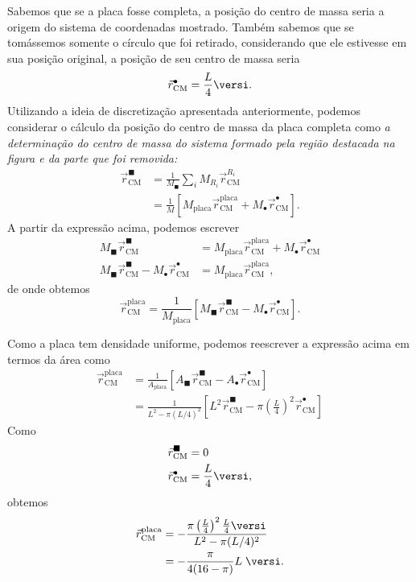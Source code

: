 Sabemos que se a placa fosse completa, a posição do centro de massa seria a origem do sistema de coordenadas mostrado. Também sabemos que se tomássemos somente o círculo que foi retirado, considerando que ele estivesse em sua posição original, a posição de seu centro de massa seria
\begin{equation}
    \vec{r}_{\text{CM}}^{\bullet} = \frac{L}{4} \versi.
\end{equation}
%
Utilizando a ideia de discretização apresentada anteriormente, podemos considerar o cálculo da posição do centro de massa da placa completa como \emph{a determinação do centro de massa do sistema formado pela região destacada na figura e da parte que foi removida:}
\begin{align}
    \vec{r}_{\text{CM}}^{\blacksquare} &= \frac{1}{M_{\blacksquare}} \sum_i M_{R_i} \vec{r}_{\text{CM}}^{R_i} \\
    &= \frac{1}{M} [M_{\text{placa}} \vec{r}_{\text{CM}}^{\text{placa}} + M_{\bullet} \vec{r}_{\text{CM}}^{\bullet}].
\end{align}
%
A partir da expressão acima, podemos escrever
\begin{align}
    M_{\blacksquare} \vec{r}_{\text{CM}}^{\blacksquare} &= M_{\text{placa}} \vec{r}_{\text{CM}}^{\text{placa}} + M_{\bullet} \vec{r}_{\text{CM}}^{\bullet} \\
    M_{\blacksquare} \vec{r}_{\text{CM}}^{\blacksquare} - M_{\bullet} \vec{r}_{\text{CM}}^{\bullet} &= M_{\text{placa}} \vec{r}_{\text{CM}}^{\text{placa}},
\end{align}
%
de onde obtemos
\begin{equation}
    \vec{r}_{\text{CM}}^{\text{placa}} = \frac{1}{M_{\text{placa}}} [M_{\blacksquare} \vec{r}_{\text{CM}}^{\blacksquare} - M_{\bullet} \vec{r}_{\text{CM}}^{\bullet}].
\end{equation}

Como a placa tem densidade uniforme, podemos reescrever a expressão acima em termos da área como
\begin{align}
    \vec{r}_{\text{CM}}^{\text{placa}} &= \frac{1}{A_{\text{placa}}} [A_{\blacksquare} \vec{r}_{\text{CM}}^{\blacksquare} - A_{\bullet} \vec{r}_{\text{CM}}^{\bullet}] \\
    &= \frac{1}{L^2 - \pi(L/4)^2} [L^2 \vec{r}_{\text{CM}}^{\blacksquare} - \pi\left(\frac{L}{4}\right)^2 \vec{r}_{\text{CM}}^{\bullet}]
\end{align}
%
Como
\begin{align}
    \vec{r}_{\text{CM}}^{\blacksquare} &= 0 \\
    \vec{r}_{\text{CM}}^{\bullet} &= \frac{L}{4} \versi,
\end{align}
%
obtemos
\begin{align}
    \vec{r}_{\text{CM}}^{\text{placa}} &= -\frac{ \pi\left(\frac{L}{4}\right)^2 \frac{L}{4}\versi}{L^2 - \pi(L/4)^2} \\
    &=- \frac{\pi}{4(16-\pi)}L \; \versi.
\end{align}

